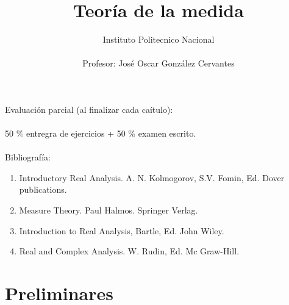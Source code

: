 \documentclass[twoside,12pt,a4 paper,openright]{book}
\title{Teor\'ia de la medida}
\author{      Instituto Politecnico Nacional \\
\\
							Profesor: Jos\'e Oscar Gonz\'alez Cervantes}
\begin{document}
\maketitle

\tableofcontents

\vspace{2cm}
Evaluaci\'on parcial (al finalizar cada ca\'itulo): 
\\
\\

50 \% entregra de ejercicios + 50 \% examen escrito.  
\\
\\


Bibliograf\'ia:

\begin{enumerate}
\item Introductory Real Analysis. A. N. Kolmogorov, S.V. Fomin, Ed. Dover publications.

\item Measure Theory. Paul Halmos. Springer Verlag.


\item Introduction to  Real Analysis,  Bartle, Ed. John Wiley.

\item Real and Complex Analysis. W. Rudin, Ed. Mc Graw-Hill.  
\end{enumerate}



\chapter{Preliminares}  
\end{document}
